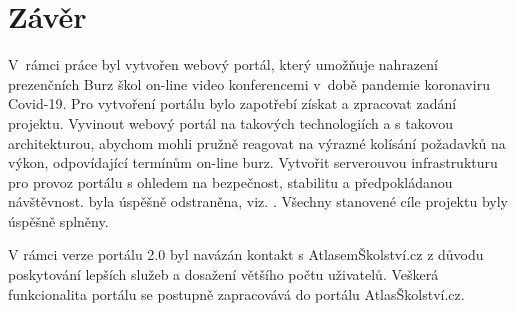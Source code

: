\chapter*{Závěr}

V~rámci práce byl vytvořen webový portál, který umožňuje nahrazení prezenčních Burz škol on-line video konferencemi v~době pandemie koronaviru Covid-19.
Pro vytvoření portálu bylo zapotřebí získat a zpracovat zadání projektu. 
Vyvinout webový portál na takových technologiích a s takovou architekturou, abychom mohli pružně reagovat na výrazné kolísání požadavků 
na výkon, odpovídající termínům on-line burz.
Vytvořit serverouvou infrastrukturu pro provoz portálu s ohledem na bezpečnost, stabilitu a předpokládanou návštěvnost.
 byla úspěšně odstraněna, viz. .
Všechny stanovené cíle projektu byly úspěšně splněny.

V rámci verze portálu 2.0 byl navázán kontakt s AtlasemŠkolství.cz z důvodu poskytování lepších služeb a dosažení většího počtu uživatelů.
Veškerá funkcionalita portálu \bso{} se postupně zapracovává do portálu AtlasŠkolství.cz.



% 
% 
% 
% 

\pagebreak
